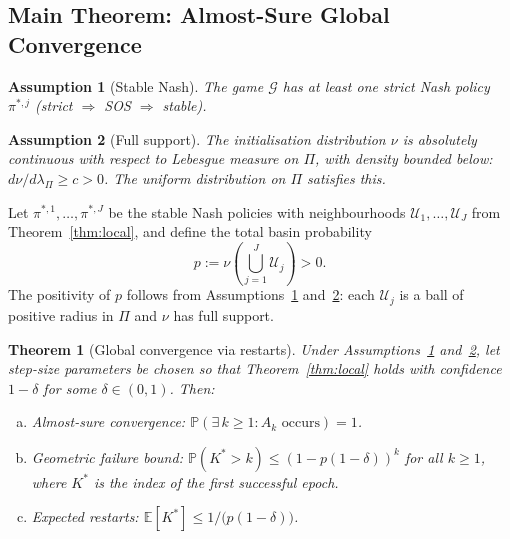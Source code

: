 \documentclass{article}
\newtheorem{theorem}{Theorem}
\newtheorem{assumption}{Assumption}
\newcommand{\E}{\mathbb{E}}
\newcommand{\Prob}{\mathbb{P}}
\newcommand{\calG}{\mathcal{G}}
\newcommand{\calU}{\mathcal{U}}
\begin{document}
\subsection{Main Theorem: Almost-Sure Global Convergence}
\label{sec:main}

\begin{assumption}[Stable Nash]
\label{ass:nash}
The game $\calG$ has at least one strict Nash policy $\pi^{*,j}$
(strict $\Rightarrow$ SOS $\Rightarrow$ stable).
\end{assumption}

\begin{assumption}[Full support]
\label{ass:support}
The initialisation distribution $\nu$ is absolutely continuous with
respect to Lebesgue measure on $\Pi$, with density bounded below:
$d\nu/d\lambda_\Pi \ge c > 0$. The uniform distribution on $\Pi$
satisfies this.
\end{assumption}

Let $\pi^{*,1}, \ldots, \pi^{*,J}$ be the stable Nash policies with
neighbourhoods $\calU_1, \ldots, \calU_J$ from Theorem~\ref{thm:local},
and define the total basin probability
\begin{equation}
  \label{eq:basin}
  p := \nu\!\left(\bigcup_{j=1}^J \calU_j\right) > 0.
\end{equation}
The positivity of $p$ follows from Assumptions~\ref{ass:nash}
and~\ref{ass:support}: each $\calU_j$ is a ball of positive radius in
$\Pi$ and $\nu$ has full support.

\begin{theorem}[Global convergence via restarts]
\label{thm:global}
Under Assumptions~\ref{ass:nash} and~\ref{ass:support}, let step-size
parameters be chosen so that Theorem~\ref{thm:local} holds with
confidence $1 - \delta$ for some $\delta \in (0,1)$. Then:
\begin{enumerate}[(a)]
\item \emph{Almost-sure convergence:}
  $\Prob\!\left(\exists\, k \ge 1 : A_k \text{ occurs}\right) = 1$.
\item \emph{Geometric failure bound:}
  $\Prob(K^* > k) \le (1 - p(1-\delta))^k$ for all $k \ge 1$,
  where $K^*$ is the index of the first successful epoch.
\item \emph{Expected restarts:} $\E[K^*] \le 1/\bigl(p(1-\delta)\bigr)$.
\end{enumerate}
\end{theorem}
\end{document}
